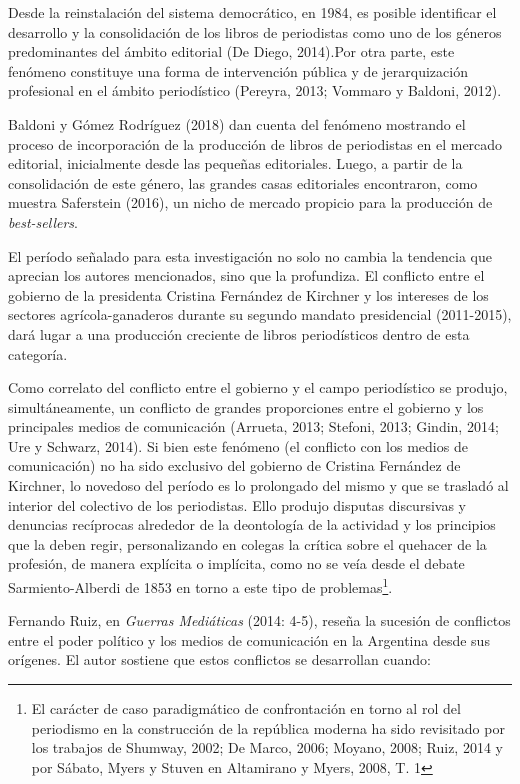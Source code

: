 Desde la reinstalación del sistema democrático, en 1984, es posible identificar el desarrollo y la consolidación de los libros de periodistas como uno de los géneros predominantes del ámbito editorial (De Diego, 2014).Por otra parte, este fenómeno constituye una forma de intervención pública y de jerarquización profesional en el ámbito periodístico (Pereyra, 2013; Vommaro y Baldoni, 2012).

Baldoni y Gómez Rodríguez (2018) dan cuenta del fenómeno mostrando el proceso de incorporación de la producción de libros de periodistas en el mercado editorial, inicialmente desde las pequeñas editoriales. Luego, a partir de la consolidación de este género, las grandes casas editoriales encontraron, como muestra Saferstein (2016), un nicho de mercado propicio para la producción de \emph{best-sellers}.

El período señalado para esta investigación no solo no cambia la tendencia que aprecian los autores mencionados, sino que la profundiza. El conflicto entre el gobierno de la presidenta Cristina Fernández de Kirchner y los intereses de los sectores agrícola-ganaderos durante su segundo mandato presidencial (2011-2015), dará lugar a una producción creciente de libros periodísticos dentro de esta categoría.

Como correlato del conflicto entre el gobierno y el campo periodístico se produjo, simultáneamente, un conflicto de grandes proporciones entre el gobierno y los principales medios de comunicación (Arrueta, 2013; Stefoni, 2013; Gindin, 2014; Ure y Schwarz, 2014). Si bien este fenómeno (el conflicto con los medios de comunicación) no ha sido exclusivo del gobierno de Cristina Fernández de Kirchner, lo novedoso del período es lo prolongado del mismo y que se trasladó al interior del colectivo de los periodistas. Ello produjo disputas discursivas y denuncias recíprocas alrededor de la deontología de la actividad y los principios que la deben regir, personalizando en colegas la crítica sobre el quehacer de la profesión, de manera explícita o implícita, como no se veía desde el debate Sarmiento-Alberdi de 1853 en torno a este tipo de problemas\footnote{El carácter de caso paradigmático de confrontación en torno al rol del periodismo en la construcción de la república moderna ha sido revisitado por los trabajos de Shumway, 2002; De Marco, 2006; Moyano, 2008; Ruiz, 2014 y por Sábato, Myers y Stuven en Altamirano y Myers, 2008, T. 1}.

Fernando Ruiz, en \emph{Guerras Mediáticas} (2014: 4-5), reseña la sucesión de conflictos entre el poder político y los medios de comunicación en la Argentina desde sus orígenes. El autor sostiene que estos conflictos se desarrollan cuando:

